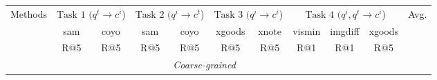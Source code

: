 \begin{tabular}{lcccccccccc}
\toprule
\multirow{3}{*}{Methods} &
  \multicolumn{2}{c}{$\text{Task 1 (}q^t \rightarrow c^i$)} &
  \multicolumn{2}{c}{$\text{Task 2 (}q^i \rightarrow c^t$)} &
  \multicolumn{2}{c}{$\text{Task 3 (}q^i \rightarrow c^i$)} &
  \multicolumn{3}{c}{$\text{Task 4 (}q^i, q^t \rightarrow c^i$)} &
\multirow{3}{*}{Avg.} \\
\cmidrule(lr){2-3} %
\cmidrule(lr){4-5}
\cmidrule(lr){6-7}
\cmidrule(lr){8-10}
& sam & coyo & sam & coyo & xgoods & xnote & vismin & imgdiff & xgoods & \\
\cmidrule(lr){2-3} %
\cmidrule(lr){4-5}
\cmidrule(lr){6-7}
\cmidrule(lr){8-10}
& R@5 & R@5 & R@5 & R@5 & R@5 & R@5 & R@1 & R@1 & R@5 & \\
\midrule
\multicolumn{10}{c}{\textit{Coarse-grained}} \\
\midrule


\end{tabular}
